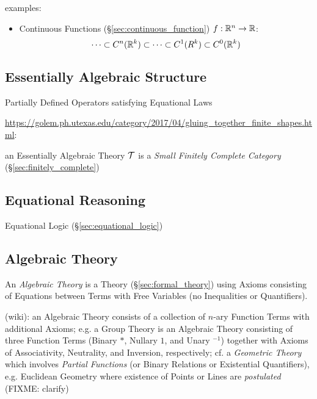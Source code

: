 examples:
\begin{itemize}
  \item Continuous Functions (\S\ref{sec:continuous_function})
    $f : \mathbb{R}^n \rightarrow \mathbb{R}$:
    \[
      \cdots \subset C^n(\mathbb{R}^k) \subset \cdots \subset C^1(R^k) \subset
        C^0(\mathbb{R}^k)
    \]
\end{itemize}



\subsection{Essentially Algebraic Structure}
\label{sec:essentially_algebraic}

Partially Defined Operators satisfying Equational Laws

\url{https://golem.ph.utexas.edu/category/2017/04/gluing_together_finite_shapes.html}:

an Essentially Algebraic Theory $\mathcal{T}$ is a \emph{Small Finitely Complete
  Category} (\S\ref{sec:finitely_complete})



\subsection{Equational Reasoning}\label{sec:equational_reasoning}

Equational Logic (\S\ref{sec:equational_logic})



\subsection{Algebraic Theory}\label{sec:algebraic_theory}

An \emph{Algebraic Theory} is a Theory (\S\ref{sec:formal_theory}) using Axioms
consisting of Equations between Terms with Free Variables (no Inequalities or
Quantifiers).

(wiki): an Algebraic Theory consists of a collection of $n$-ary Function Terms
with additional Axioms; e.g. a Group Theory is an Algebraic Theory consisting of
three Function Terms (Binary $*$, Nullary $1$, and Unary $^{-1}$) together with
Axioms of Associativity, Neutrality, and Inversion, respectively; cf. a
\emph{Geometric Theory} which involves \emph{Partial Functions} (or Binary
Relations or Existential Quantifiers), e.g. Euclidean Geometry where existence
of Points or Lines are \emph{postulated} (FIXME: clarify)

